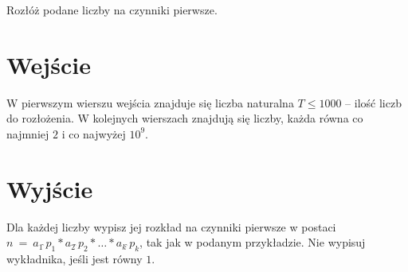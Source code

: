 \documentclass{spiral-kurs}
\begin{document}
\makeheader
%

Rozłóż podane liczby na czynniki pierwsze.

    \section{Wejście}
    W pierwszym wierszu wejścia znajduje się liczba naturalna $T \leq 1000$ -- ilość liczb do rozłożenia. W kolejnych wierszach znajdują się liczby,
    każda równa co najmniej $2$ i co najwyżej $10^9$.

    \section{Wyjście}

Dla każdej liczby wypisz jej rozkład na czynniki pierwsze w postaci\\
$n\ =\ a_1 \hat{\ } p_1*a_2\hat{\ }p_2 * \ldots * a_k \hat{\ } p_k$, tak jak w podanym przykładzie. Nie wypisuj wykładnika, jeśli jest równy $1$.

  
\end{document}
